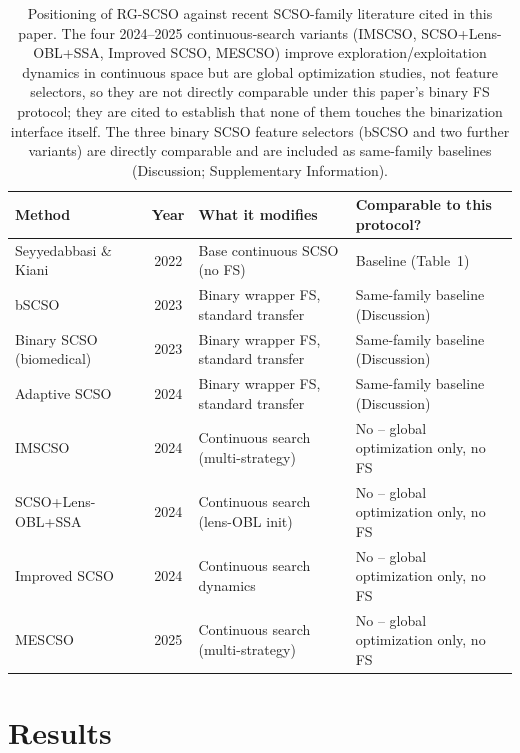 \documentclass[preprint,3p,times]{elsarticle}
\begin{document}
\begin{table}[!tbp]
\centering
\caption{Positioning of RG-SCSO against recent SCSO-family literature cited in this paper. The four 2024--2025 continuous-search variants (IMSCSO, SCSO+Lens-OBL+SSA, Improved SCSO, MESCSO) improve exploration/exploitation dynamics in continuous space but are global optimization studies, not feature selectors, so they are not directly comparable under this paper's binary FS protocol; they are cited to establish that none of them touches the binarization interface itself. The three binary SCSO feature selectors (bSCSO and two further variants) are directly comparable and are included as same-family baselines (Discussion; Supplementary Information).}
\label{tab:litpos}
\footnotesize
\begin{tabular}{p{4.6cm}cp{4.3cm}p{4.3cm}}
\toprule
Method & Year & What it modifies & Comparable to this protocol? \\
\midrule
Seyyedabbasi \& Kiani~\cite{scso} & 2022 & Base continuous SCSO (no FS) & Baseline (Table~1) \\
bSCSO~\cite{bscso} & 2023 & Binary wrapper FS, standard transfer & Same-family baseline (Discussion) \\
Binary SCSO (biomedical)~\cite{scsofs2} & 2023 & Binary wrapper FS, standard transfer & Same-family baseline (Discussion) \\
Adaptive SCSO~\cite{scsofs3} & 2024 & Binary wrapper FS, standard transfer & Same-family baseline (Discussion) \\
IMSCSO~\cite{imscso2024} & 2024 & Continuous search (multi-strategy) & No -- global optimization only, no FS \\
SCSO+Lens-OBL+SSA~\cite{scsolensobl2024} & 2024 & Continuous search (lens-OBL init) & No -- global optimization only, no FS \\
Improved SCSO~\cite{improvedscso2024} & 2024 & Continuous search dynamics & No -- global optimization only, no FS \\
MESCSO~\cite{mescso2025} & 2025 & Continuous search (multi-strategy) & No -- global optimization only, no FS \\
\bottomrule
\end{tabular}
\end{table}


\FloatBarrier
\section{Results}
\end{document}
